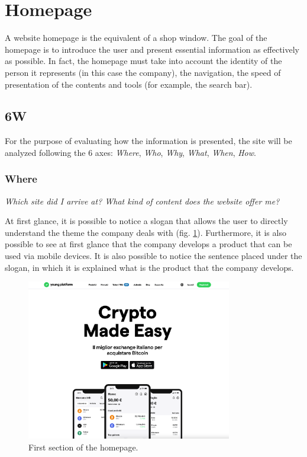 \section{Homepage}

A website homepage is the equivalent of a shop window. The goal of the 
homepage is to introduce the user and present essential information as 
effectively as possible. In fact, the homepage must take into account the 
identity of the person it represents (in this case the company), the 
navigation, the speed of presentation of the contents and tools 
(for example, the search bar).

\subsection{6W}

For the purpose of evaluating how the information is presented, the site 
will be analyzed following the 6 axes: \textit{Where}, \textit{Who}, 
\textit{Why}, \textit{What}, \textit{When}, \textit{How}. 

\subsubsection{Where}

\centerline{\textit{Which site did I arrive at? What kind of content does 
the website offer me?}}
At first glance, it is possible to notice a slogan that allows the user 
to directly understand the theme the company deals with 
(fig. \ref{fig:homepage-1}). Furthermore, it is also possible to see at 
first glance that the company develops a product that can be used via 
mobile devices. It is also possible to notice the sentence placed under 
the slogan, in which it is explained what is the product that the company 
develops.

\begin{figure}[H]
	\centering
	\includegraphics[width=0.80\textwidth]{res/images/homepage-1.png}
	\caption{First section of the homepage.}
	\label{fig:homepage-1}
\end{figure}

